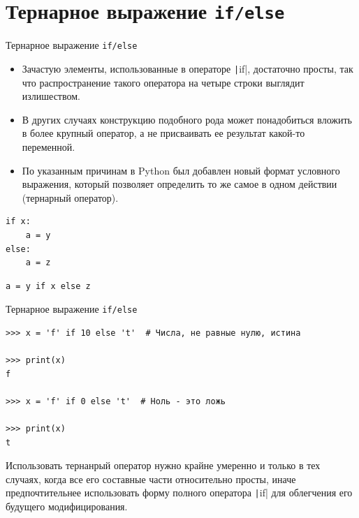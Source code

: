 \documentclass[aspectratio=169]{beamer}	%
\begin{document}
\section{Тернарное выражение \texttt{if/else}}
\sectionframe


\begin{frame}[fragile]{Тернарное выражение \texttt{if/else}}
\scriptsize
\begin{itemize}
	\item Зачастую элементы, использованные в операторе \texttt|if|, достаточно просты, так что распространение такого оператора на четыре строки выглядит излишеством.
	
	\item В других случаях конструкцию подобного рода может понадобиться вложить в более крупный оператор, а не присваивать ее результат какой-то переменной.
	
	\item По указанным причинам в Python был добавлен новый формат условного выражения, который позволяет определить то же самое в одном действии (тернарный оператор).
\end{itemize}

\begin{multicols}{2}

\begin{verbatim}
if x:
    a = y
else:
    a = z
\end{verbatim}

\columnbreak

\begin{verbatim}
a = y if x else z
\end{verbatim}
\end{multicols}
\vfill
\end{frame}


\begin{frame}[fragile]{Тернарное выражение \texttt{if/else}}
\scriptsize
\begin{verbatim}
>>> x = 'f' if 10 else 't'  # Числа, не равные нулю, истина

>>> print(x)
f

>>> x = 'f' if 0 else 't'  # Ноль - это ложь

>>> print(x)
t
\end{verbatim}
Использовать тернанрый оператор нужно крайне умеренно и только в тех случаях, когда все его составные части относительно просты, иначе предпочтительнее использовать форму полного оператора \texttt|if| для облегчения его  будущего модифицирования.
\vfill
\end{frame}
\end{document}

